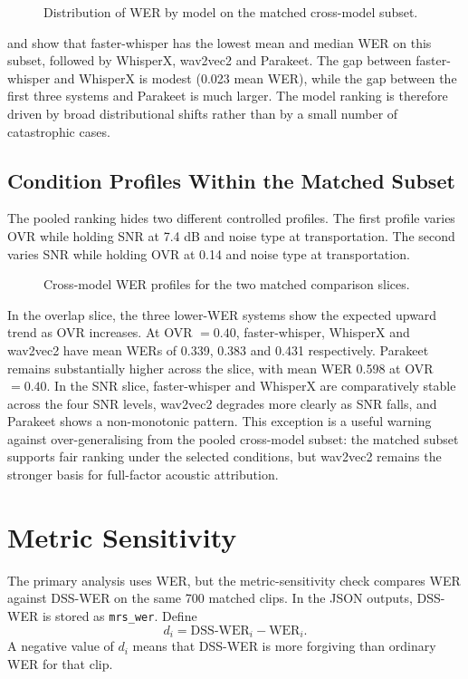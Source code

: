 \begin{figure}[htbp]
    \centering
    \caption{Distribution of WER by model on the matched cross-model subset.}
    \label{fig:stat_cross_model_box}
\end{figure}

 and  show that faster-whisper
has the lowest mean and median WER on this subset, followed by WhisperX, wav2vec2 and Parakeet.
The gap between faster-whisper and WhisperX is modest (0.023 mean WER), while the gap between
the first three systems and Parakeet is much larger. The model ranking is therefore driven by
broad distributional shifts rather than by a small number of catastrophic cases.

\subsection{Condition Profiles Within the Matched Subset}
The pooled ranking hides two different controlled profiles. The first profile varies OVR while
holding SNR at 7.4 dB and noise type at transportation. The second varies SNR while holding OVR
at 0.14 and noise type at transportation.

\begin{figure}[htbp]
    \centering
    \caption{Cross-model WER profiles for the two matched comparison slices.}
    \label{fig:stat_cross_model_profiles}
\end{figure}

In the overlap slice, the three lower-WER systems show the expected upward trend as OVR
increases. At OVR \(=0.40\), faster-whisper, WhisperX and wav2vec2 have mean WERs of 0.339,
0.383 and 0.431 respectively. Parakeet remains substantially higher across the slice, with mean
WER 0.598 at OVR \(=0.40\). In the SNR slice, faster-whisper and WhisperX are comparatively
stable across the four SNR levels, wav2vec2 degrades more clearly as SNR falls, and Parakeet
shows a non-monotonic pattern. This exception is a useful warning against over-generalising from
the pooled cross-model subset: the matched subset supports fair ranking under the selected
conditions, but wav2vec2 remains the stronger basis for full-factor acoustic attribution.

\section{Metric Sensitivity}
The primary analysis uses WER, but the metric-sensitivity check compares WER against DSS-WER on
the same 700 matched clips. In the JSON outputs, DSS-WER is stored as \texttt{mrs\_wer}. Define
\begin{equation}
    d_i = \mathrm{DSS\mbox{-}WER}_i - \mathrm{WER}_i.
\end{equation}
A negative value of \(d_i\) means that DSS-WER is more forgiving than ordinary WER for that clip.

